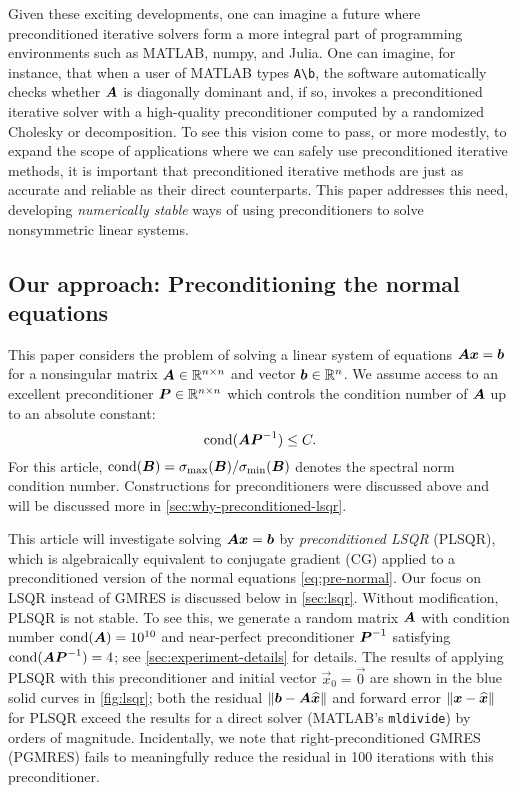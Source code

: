 \documentclass[onefignum,onetabnum,pagebackref,dvipsnames]{siamart220329}
\begin{document}
Given these exciting developments, one can imagine a future where preconditioned iterative solvers form a more integral part of programming environments such as MATLAB, numpy, and Julia.
One can imagine, for instance, that when a user of MATLAB types \texttt{A{\textbackslash}b}, the software automatically checks whether $\boldsymbol{A}$ is diagonally dominant and, if so, invokes a preconditioned iterative solver with a high-quality preconditioner computed by a randomized Cholesky or \LU decomposition.
To see this vision come to pass, or more modestly, to expand the scope of applications where we can safely use preconditioned iterative methods, it is important that preconditioned iterative methods are just as accurate and reliable as their direct counterparts.
This paper addresses this need, developing \emph{numerically stable} ways of using preconditioners to solve nonsymmetric linear systems.

\subsection{Our approach: Preconditioning the normal equations}

This paper considers the problem of solving a linear system of equations $\boldsymbol{A}\boldsymbol{x} = \boldsymbol{b}$ for a nonsingular matrix $\boldsymbol{A} \in \mathbb{R}^{n\times n}$ and vector $\boldsymbol{b} \in \mathbb{R}^n$.
We assume access to an excellent preconditioner $\boldsymbol{P}\in\mathbb{R}^{n\times n}$ which controls the condition number of $\boldsymbol{A}$ up to an absolute constant:
%
\begin{equation} \label{eq:good-prec}
    \operatorname{cond}(\boldsymbol{A}\boldsymbol{P}^{-1}) \le C.
\end{equation}
%
For this article, $\operatorname{cond}(\boldsymbol{B}) = \sigma_{\rm max}(\boldsymbol{B}) / \sigma_{\min}(\boldsymbol{B})$ denotes the spectral norm condition number.
Constructions for preconditioners were discussed above and will be discussed more in \cref{sec:why-preconditioned-lsqr}.

This article will investigate solving $\boldsymbol{A}\boldsymbol{x} = \boldsymbol{b}$ by \emph{preconditioned LSQR} (PLSQR), which is algebraically equivalent to conjugate gradient (CG) applied to a preconditioned version of the normal equations \cref{eq:pre-normal}.
Our focus on LSQR instead of GMRES is discussed below in \cref{sec:lsqr}.
Without modification, PLSQR is not stable.
To see this, we generate a random matrix $\boldsymbol{A}$ with condition number $\operatorname{cond}(\boldsymbol{A}) = 10^{10}$ and near-perfect preconditioner $\boldsymbol{P}^{-1}$ satisfying $\operatorname{cond}(\boldsymbol{A}\boldsymbol{P}^{-1}) = 4$; see \cref{sec:experiment-details} for details.
The results of applying PLSQR with this preconditioner and initial vector $\vec{x}_0 = \vec{0}$ are shown in the blue solid curves in \cref{fig:lsqr}; both the residual $\norm{\vec{b} - \mat{A}\smash{\vec{\hat{x}}}}$ and forward error $\norm{\vec{x} - \smash{\vec{\hat{x}}}}$ for PLSQR exceed the results for a direct solver (MATLAB's \texttt{mldivide}) by orders of magnitude.
Incidentally, we note that right-preconditioned GMRES (PGMRES) fails to meaningfully reduce the residual in 100 iterations with this preconditioner.
\end{document}
